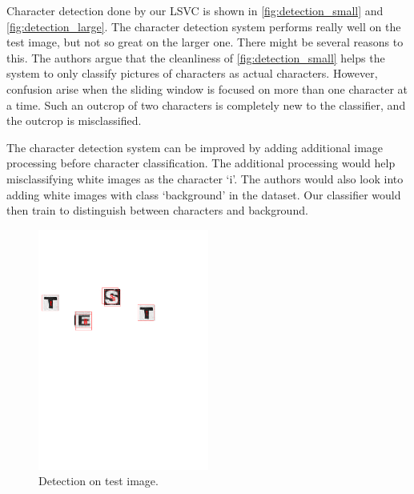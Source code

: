 \documentclass[../main.tex]{subfiles}
\begin{document}
Character detection done by our LSVC is shown in \autoref{fig:detection_small} and
\autoref{fig:detection_large}. The character detection system performs really
well on the test image, but not so great on the larger one. There might be
several reasons to this. The authors argue that the cleanliness of
\autoref{fig:detection_small} helps the system to only classify pictures of
characters as actual characters. However, confusion arise when the sliding
window is focused on more than one character at a time. Such an outcrop of two
characters is completely new to the classifier, and the outcrop is misclassified.

The character detection system can be improved by adding additional image
processing before character classification. The additional processing would help
misclassifying white images as the character `i'. The authors would also look
into adding white images with class `background' in the dataset. Our classifier
would then train to distinguish between characters and background.


\begin{figure}[t!]
  \hspace{3.9cm}\includegraphics[trim={4cm, 15cm, 4cm, 1cm},width=0.5\textwidth]{figures/character_detection/detection_2.pdf}
  \caption{Detection on test image.}
  \label{fig:detection_small}
\end{figure}
\end{document}
